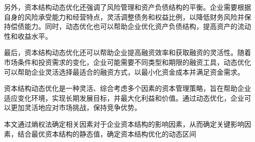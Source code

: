 另外，资本结构动态优化还强调了风险管理和资产负债结构的平衡。企业需要根据自身的风险承受能力和经营特点，灵活调整债务和权益比例，以降低财务风险并保持偿债能力。同时，动态优化也可以帮助企业优化资产负债结构，提高资产的流动性和收益水平。

最后，资本结构动态优化还可以帮助企业提高融资效率和获取融资的灵活性。随着市场条件和投资需求的变化，企业可能需要不同类型和期限的融资工具，动态优化可以帮助企业灵活选择最适合的融资方式，以最小化资金成本并满足资金需求。

资本结构动态优化是一种灵活、综合考虑多个因素的资本管理策略，旨在帮助企业适应变化环境，实现长期发展目标，并最大化利益和价值。通过动态优化，企业可以更加灵活地应对市场挑战，保持竞争优势。

本文通过熵权法确定相关因素对于企业资本结构的影响因素，从而确定关键影响因素，结合最优资本结构的静态值，确定资本结构优化的动态区间   